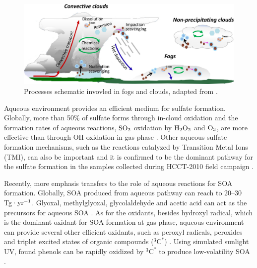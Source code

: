 \documentclass[edeposit,fullpage]{uiucthesis2009}
\begin{document}
\begin{figure}
	\centering
	\includegraphics[scale=1.0]{chap1_figs/thesis_chap1_fig4.jpeg}
	\caption{Processes schematic invovled in fogs and clouds, adapted from \citet{ervens2015modeling}.}
	\label{fig:chap1-aq-proc}
\end{figure}

Aqueous environment provides an efficient medium for sulfate formation. Globally, more than 50\% of sulfate forms through in-cloud oxidation and the formation rates of aqueous reactions, $\rm SO_2$ oxidation by $\rm H_2O_2$ and $\rm O_3$, are more effective than through OH oxidation in gas phase \citep{kreidenweis2003modification, rasch2000description}. Other aqueous sulfate formation mechanisms, such as the reactions catalyzed by Transition Metal Ions (TMI), can also be important and it is confirmed to be the dominant pathway for the sulfate formation in the samples collected during HCCT-2010 field campaign \citep{harris2012sulfur, harris2013enhanced}. 

Recently, more emphasis transfers to the role of aqueous reactions for SOA formation. Globally, SOA produced from aqueous pathway can reach to 20--30 Tg·$\rm yr^{-1}$. Glyoxal, methylglyoxal, glycolaldehyde and acetic acid can act as the precursors for aqueous SOA \citep{liu2012global}. As for the oxidants, besides hydroxyl radical, which is the dominant oxidant for SOA formation at gas phase, aqueous environment can provide several other efficient oxidants, such as peroxyl radicals, peroxides and triplet excited states of organic compounds ($^{3}\textrm{C}^*$) \citep{mcneill2015aqueous, ervens2011secondary}. Using simulated sunlight UV, \citet{smith2014secondary} found phenols can be rapidly oxidized by $^{3}\textrm{C}^*$ to produce low-volatility SOA . 
\end{document}
